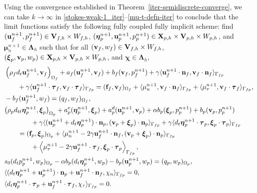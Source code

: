 \documentclass[11pt]{article}
\def\u{{\bf u}}
\def\bv{{\bf v}}
\def\n{{\bf n}}
\def\f{{\bf f}}
\def\btau{\boldsymbol{\tau}}
\def\bbeta{\boldsymbol{\eta}}
\def\bxi{\boldsymbol{\xi}}
\def\bchi{\boldsymbol{\chi}}
\def\bmu{\boldsymbol{\mu}}
\def\bL{\boldsymbol{\Lambda}}
\def\V{{\bf V}}
\def\X{{\bf X}}
\def\O{\Omega}
\def\<{\langle}
\def\>{\rangle}
\def\dt{d_t}
\def\dtt{d_{tt}}
\begin{document}
Using the convergence established in Theorem~\ref{iter-semidiscrete-converge}, we can take $k \to \infty$ in \eqref{stokes-weak-1_iter}--\eqref{mu-t-defn-iter} to conclude that the limit functions satisfy the following fully coupled fully implicit scheme: find $(\u_{f}^{n+1}, p_{f}^{n+1}) \in \V_{f,h}\times W_{f,h}$, $(\bbeta_{p}^{n+1},\u_p^{n+1},p_{p}^{n+1}) \in \X_{p,h}\times\V_{p,h}\times W_{p,h}$, and $\bmu_n^{n+1} \in \bL_{h}$ such that for all $(\bv_f,w_f) \in \V_{f,h}\times W_{f,h}$, $(\bxi_p,\bv_p,w_p) \in \X_{p,h}\times\V_{p,h}\times W_{p,h}$, and $\bchi \in \bL_h$,
%
\begin{align}
  & \left(\rho_f \dt \u_{f}^{n+1},\bv_{f}\right)_{\O_f} + a_{f}(\u_{f}^{n+1},\bv_{f}) + b_f(\bv_{f},p_{f}^{n+1}) + \gamma\<\u_f^{n+1}\cdot\n_f,\bv_f\cdot\n_f\>_{\Gamma_{fp}}
  \nonumber \\
  & \qquad  +  \gamma \<\u_f^{n+1}\cdot\btau_{f},\bv_f\cdot\btau_{f}\>_{\Gamma_{fp}} = (\f_{f},\bv_{f})_{\O_f} + \<\mu_n^{n+1},\bv_f\cdot\n_{f}\>_{\Gamma_{fp}} 
   + \<\mu_{\tau}^{n+1},\bv_f\cdot\btau_{f}\>_{\Gamma_{fp}}, \label{stokes-coupled-1}\\
 & - b_f(\u^{n+1}_{f},w_{f}) = (q_{f},w_{f})_{\O_f}, \label{stokes-coupled-2}\\
  &\big(\rho_p\dtt\bbeta_{p}^{n+1},\bxi_{p}\big)_{\O_p}
  + a^e_{p}(\bbeta_{p}^{n+1},\bxi_{p})
  + a^d_{p}(\u_{p}^{n+1},\bv_{p})
  + \alpha b_p(\bxi_{p},p_{p}^{n+1})
  + b_p(\bv_{p},p_{p}^{n+1})
  \nonumber \\
  & \qquad\qquad  + \gamma\<(\u_p^{n+1} + \dt\bbeta_p^{n+1})\cdot\n_p,
        (\bv_p + \bxi_p)\cdot\n_p\>_{\Gamma_{fp}}
  + \gamma\<\dt\bbeta_p^{n+1}\cdot\btau_p,\bxi_p\cdot\btau_p\>_{\Gamma_{fp}}
  \nonumber \\
  & \qquad = (\f_{p},\bxi_{p})_{\O_p}
  + \<\mu_n^{n+1} - 2\gamma\u_f^{n+1}\cdot\n_f,
  (\bv_p + \bxi_p)\cdot\n_p\>_{\Gamma_{fp}} \nonumber \\
  & \qquad\qquad + \left\<\mu_{\tau}^{n+1}
  - 2\gamma\u_f^{n+1}\cdot\btau_f,\bxi_p\cdot\btau_p\right\>_{\Gamma_{fp}},
  \label{biot-coupled-1} \\
& s_0(\dt p_{p}^{n+1},w_{p})_{\O_p} - \alpha b_p(\dt\bbeta_{p}^{n+1},w_{p}) - b_p(\u_{p}^{n+1},w_{p}) = (q_{p},w_{p})_{\O_p}, \label{biot-coupled-2}\\
  & \<(\dt \bbeta_p^{n+1} + \u_p^{n+1})\cdot\n_p + \u_f^{n+1}\cdot\n_f,\chi_n\>_{\Gamma_{fp}} = 0,
  \label{mu-n-coupled} \\
  & \<\dt \bbeta_p^{n+1} \cdot\btau_p + \u_f^{n+1}\cdot\btau_f,\chi_\tau\>_{\Gamma_{fp}} = 0.
  \label{mu-t-coupled} 
\end{align}
\end{document}
